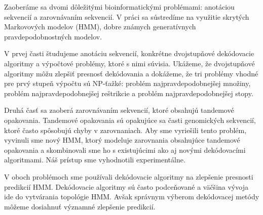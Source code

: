 Zaoberáme sa dvomi dôležitými bioinformatickými problémami: anotáciou sekvencií
a zarovnávaním sekvencií. V práci sa sústredíme na využitie skrytých Markovových modelov (HMM),
dobre známych generatívnych pravdepodobnostných modelov.

V prvej časti študujeme anotáciu sekvencií, konkrétne dvojstupňové dekódovacie algoritmy a
výpočtové problémy, ktoré s nimi súvisia. Ukážeme, že dvojstupňové algoritmy
môžu zlepšiť presnosť dekódovania a dokážeme, že tri problémy vhodné pre prvý stupeň výpočtu sú NP-ťažké:
problém najpravdepodobnejšej množiny,
problém najpravdepodobnejšej reštrikcie a problém najpravdepodobnejšej stopy.

Druhá časť sa zaoberá zarovnávaním sekvencií, ktoré obsahujú tandemové
opakovania. Tandemové opakovania sú  opakujúce sa časti genomických sekvencií,
ktoré často spôsobujú chyby v zarovnaniach. Aby sme vyriešili tento problém, vyvinuli
sme nový HMM, ktorý modeluje zarovnania obsahujúce tandemové opakovania a
skombinovali sme ho s existujúcimi ako aj novými dekódovacími algoritmami. Náš
prístup sme vyhodnotili experimentálne.

V oboch problémoch sme používali dekódovacie algoritmy na zlepšenie presnosti
predikcií HMM. Dekódovacie algoritmy sú často podceňované  a väčšina vývoja
ide do vytvárania topológie HMM. Avšak správnym výberom dekódovacej metódy môžeme
dosiahnuť významné zlepšenie predikcií.
